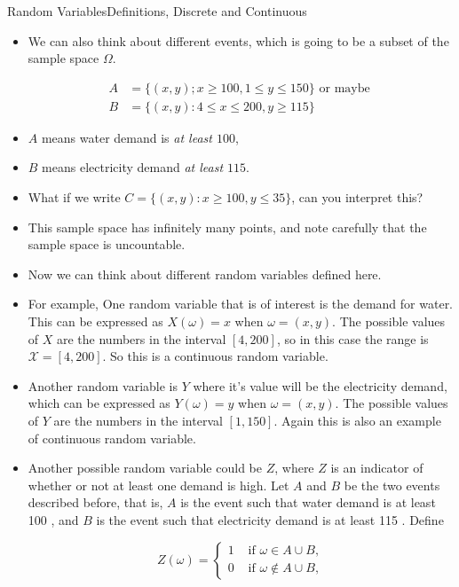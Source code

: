 \documentclass[8pt, usepdftitle=false]{beamer}
\begin{document}
\begin{frame}[allowframebreaks]{Random Variables}{Definitions, Discrete and Continuous}
\begin{itemize}
\item We can also think about different events, which is going to be a subset of the sample space $\Omega$.

\begin{align*}
A &= \{(x, y) ; x \geq 100, 1 \leq y \leq 150\} \text{ or maybe }\\
B &= \{(x, y): 4 \leq x \leq 200, y \geq 115\}
\end{align*}

\item $A$ means water demand is \emph{at least $100$}, 

\item $B$ means electricity demand \emph{at least $115$}. 

\item What if we write $C = \{(x, y): x \geq 100, y \leq 35\}$, can you interpret this?

\item This sample space has infinitely many points, and note carefully that the sample space is uncountable. 

\framebreak

\item Now we can think about different random variables defined here.


\item For example, One random variable that is of interest is the demand for water. This can be expressed as $X(\omega) = x$ when $\omega=(x, y)$.  The possible values of $X$ are the numbers in the interval $[4,200]$, so in this case the range is $\mathcal{X} = [4, 200]$. So this is a continuous random variable.

\item Another random variable is $Y$ where it's value will be the electricity demand, which can be expressed as $Y(\omega)=y$ when $\omega=(x, y)$. The possible values of $Y$ are the numbers in the interval $[1,150]$. Again this is also an example of continuous random variable.

\framebreak

\item Another possible random variable could be $Z$, where $Z$ is an \alert{indicator of} whether or not at least one demand is high. Let $A$ and $B$ be the two events described before, that is, $A$ is the event such that water demand is at least 100 , and $B$ is the event such that electricity demand is at least 115 . Define

$$
Z(\omega)= \begin{cases}1 & \text { if } \omega \in A \cup B, \\ 0 & \text { if } \omega \notin A \cup B,\end{cases}
$$


\end{itemize}
\end{frame}
\end{document}
